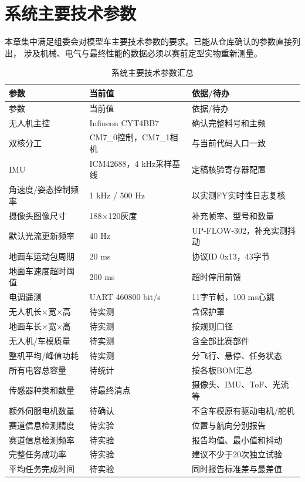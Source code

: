 \chapter{系统主要技术参数}

本章集中满足组委会对模型车主要技术参数的要求。已能从仓库确认的参数直接列出，
涉及机械、电气与最终性能的数据必须以赛前定型实物重新测量。

\begin{longtable}{p{4.4cm}p{4.0cm}p{4.1cm}}
\caption{系统主要技术参数汇总}\label{tab:system-parameters}\\
\toprule
参数 & 当前值 & 依据/待办 \\
\midrule
\endfirsthead
\toprule
参数 & 当前值 & 依据/待办 \\
\midrule
\endhead
无人机主控 & Infineon CYT4BB7 & 确认完整料号和主频 \\
双核分工 & CM7\_0控制，CM7\_1相机 & 与当前代码入口一致 \\
IMU & ICM42688，4 kHz采样基线 & 定稿核验寄存器配置 \\
角速度/姿态控制频率 & 1 kHz / 500 Hz & 以实测FY实时性日志复核 \\
摄像头图像尺寸 & 188×120灰度 & 补充帧率、型号和数量 \\
默认光流更新频率 & 40 Hz & UP-FLOW-302，补充实测抖动 \\
地面车运动包周期 & 20 ms & 协议ID 0x13，43字节 \\
地面车速度超时阈值 & 200 ms & 超时停用前馈 \\
电调遥测 & UART 460800 bit/s & 11字节帧，100 ms心跳 \\
无人机长×宽×高 & 待实测 & 含保护罩 \\
地面车长×宽×高 & 待实测 & 按规则口径 \\
无人机/车模质量 & 待实测 & 含全部比赛部件 \\
整机平均/峰值功耗 & 待实测 & 分飞行、悬停、任务状态 \\
所有电容总容量 & 待统计 & 按各板BOM汇总 \\
传感器种类和数量 & 待最终清点 & 摄像头、IMU、ToF、光流等 \\
额外伺服电机数量 & 待确认 & 不含车模原有驱动电机/舵机 \\
赛道信息检测精度 & 待实验 & 位置与航向分别报告 \\
赛道信息检测频率 & 待实验 & 报告均值、最小值和抖动 \\
完整任务成功率 & 待实验 & 建议不少于20次独立试验 \\
平均任务完成时间 & 待实验 & 同时报告标准差与最差值 \\
\bottomrule
\end{longtable}

